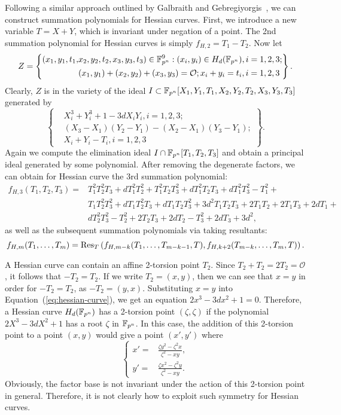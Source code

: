 Following a similar approach outlined by Galbraith and
Gebregiyorgis~\cite{DBLP:conf/indocrypt/GalbraithG14}, we can
construct summation polynomials for Hessian curves.
%
First, we introduce a new variable $T=X+Y$, which is invariant under
negation of a point.
%
The 2nd summation polynomial for Hessian curves is simply
$f_{H,2} = T_1 - T_2$.
%
Now let
\[ Z=\left\{\begin{aligned}
      (x_1,y_1,t_1,&x_2,y_2,t_2,x_3,y_3,t_3)\in\mathbb F_{p^n}^9:(x_i,y_i)\in H_d(\mathbb F_{p^n}),i=1,2,3; \\
      & (x_1,y_1)+(x_2,y_2)+(x_3,y_3)=\mathcal O; x_i+y_i=t_i,i=1,2,3
    \end{aligned} \right\}. \]
%
Clearly, $Z$ is in the variety of the ideal
$I\subset\mathbb F_{p^n}[X_1,Y_1,T_1,X_2,Y_2,T_2,X_3,Y_3,T_3]$ generated by
\[ \left\{\begin{aligned}
      & X_i^3 + Y_i^3 + 1 - 3dX_iY_i,i=1,2,3; \\
      &  (X_3 - X_1)(Y_2 - Y_1) - (X_2 - X_1)(Y_3 - Y_1); \\
      & X_i + Y_i - T_i,i=1,2,3
    \end{aligned}\right\}. \]
%
Again we compute the elimination ideal $I\cap\mathbb F_{p^n}[T_1,T_2,T_3]$ and
obtain a principal ideal generated by some polynomial.
%
After removing the degenerate factors, we can obtain for Hessian curve
the 3rd summation polynomial:
\begin{align*}
  f_{H,3}(T_1,T_2,T_3) = & T_1^2T_2^2T_3 + dT_1^2T_2^2 + T_1^2T_2T_3^2
                           + dT_1^2T_2T_3 + dT_1^2T_3^2 - T_1^2 + \\
                         & T_1T_2^2T_3^2 + dT_1T_2^2T_3 + dT_1T_2T_3^2
                           + 3d^2T_1T_2T_3 + 2T_1T_2 + 2T_1T_3 + 2dT_1
                           + \\
                         & dT_2^2T_3^2 - T_2^2 + 2T_2T_3 + 2dT_2 - T_3^2 + 2dT_3 + 3d^2,
\end{align*}
%
as well as the subsequent summation polynomials via taking resultants:
\[ f_{H,m}(T_1,\ldots,T_m) =
  \operatorname{Res}_T\left(f_{H,m-k}(T_1,\ldots,T_{m-k-1},T),f_{H,k+2}(T_{m-k},\ldots,T_m,T)\right). \]

A Hessian curve can contain an affine 2-torsion point $T_2$.
%
Since $T_2+T_2=2T_2=\mathcal O$, it follows that $-T_2=T_2$.
%
If we write $T_2=(x,y)$, then we can see that $x=y$ in order for
$-T_2=T_2$, as $-T_2=(y,x)$.
%
Substituting $x=y$ into Equation~(\ref{eq:hessian-curve}), we get an
equation $2x^3-3dx^2+1=0$.
%
Therefore, a Hessian curve $H_d(\mathbb F_{p^n})$ has a 2-torsion point
$(\zeta,\zeta)$ if the polynomial $2X^3 - 3dX^2 + 1$ has a root
$\zeta$ in $\mathbb F_{p^n}$.
%
In this case, the addition of this 2-torsion point to a point $(x,y)$
would give a point $(x',y')$ where
\[ \left\{\begin{aligned}
x' = & \frac{\zeta y^2 - \zeta^2x}{\zeta^2 - xy}, \\
y' = & \frac{\zeta x^2 - \zeta^2y}{\zeta^2 - xy}.
\end{aligned}\right. \]
%
Obviously, the factor base is not invariant under the action of this
2-torsion point in general.
%
Therefore, it is not clearly how to exploit such symmetry for Hessian
curves.


